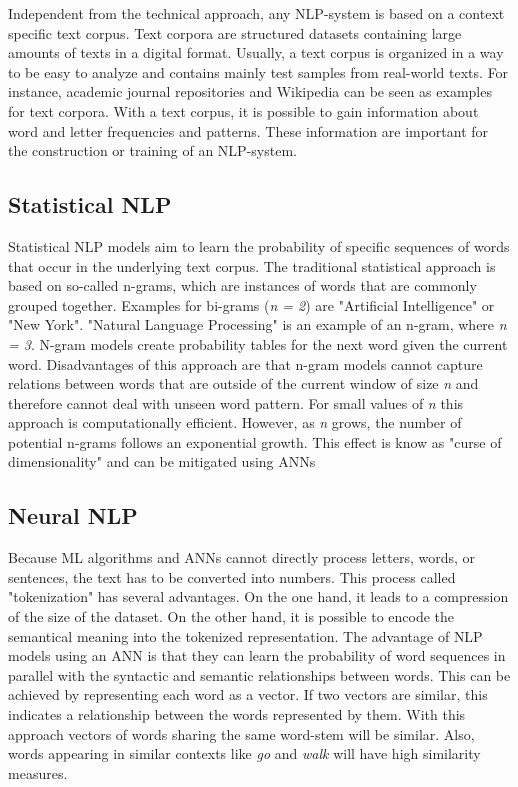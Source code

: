 Independent from the technical approach, any \ac{NLP}-system is based on a context specific text corpus. Text corpora are structured datasets containing large amounts of texts in a digital format. Usually, a text corpus is organized in a way to be easy to analyze and contains mainly test samples from real-world texts. For instance, academic journal repositories and Wikipedia can be seen as examples for text corpora. With a text corpus, it is possible to gain information about word and letter frequencies and patterns. These information are important for the construction or training of an \ac{NLP}-system.
\cite{church1995commercial,vzivzka2019text}

\subsection{Statistical NLP}
Statistical \ac{NLP} models aim to learn the probability of specific sequences of words that occur in the underlying text corpus.
The traditional statistical approach is based on so-called n-grams, which are instances of words that are commonly grouped together. Examples for bi-grams (\textit{n = 2}) are "Artificial Intelligence" or "New York". "Natural Language Processing" is an example of an n-gram, where \textit{n = 3}. N-gram models create probability tables for the next word given the current word. Disadvantages of this approach are that n-gram models cannot capture relations between words that are outside of the current window of size \textit{n} and therefore cannot deal with unseen word pattern. For small values of \textit{n} this approach is computationally efficient. However, as \textit{n} grows, the number of potential n-grams follows an exponential growth. This effect is know as "curse of dimensionality" and can be mitigated using \acp{ANN}
\cite{bengio,vzivzka2019text}

\subsection{Neural NLP}
Because \ac{ML} algorithms and \acp{ANN} cannot directly process letters, words, or sentences, the text has to be converted into numbers. This process called "tokenization" has several advantages. On the one hand, it leads to a compression of the size of the dataset. On the other hand, it is possible to encode the semantical meaning into the tokenized representation.
The advantage of \ac{NLP} models using an \ac{ANN} is that they can learn the probability of word sequences in parallel with the syntactic and semantic relationships between words. This can be achieved by representing each word as a vector. If two vectors are similar, this indicates a relationship between the words represented by them. With this approach vectors of words sharing the same word-stem will be similar. Also, words appearing in similar contexts like \textit{go} and \textit{walk} will have high similarity measures.
\cite{bengio,vzivzka2019text}

